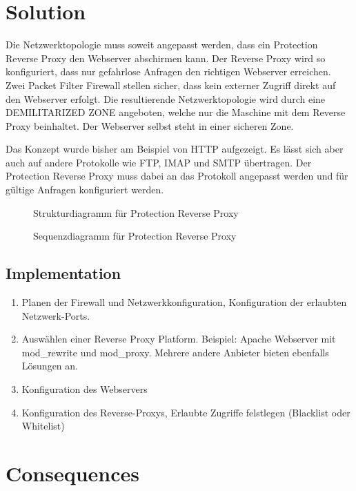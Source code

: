 \section{Solution}
Die Netzwerktopologie muss soweit angepasst werden, dass ein Protection Reverse Proxy den Webserver abschirmen kann. Der Reverse Proxy wird so konfiguriert, dass nur gefahrlose Anfragen den richtigen Webserver erreichen. Zwei Packet Filter Firewall stellen sicher, dass kein externer Zugriff direkt auf den Webserver erfolgt. Die resultierende Netzwerktopologie wird durch eine DEMILITARIZED ZONE angeboten, welche nur die Maschine mit dem Reverse Proxy beinhaltet. Der Webserver selbst steht in einer sicheren Zone.

Das Konzept wurde bisher am Beispiel von HTTP aufgezeigt. Es lässt sich aber auch auf andere Protokolle wie FTP, IMAP und SMTP übertragen. Der Protection Reverse Proxy muss dabei an das Protokoll angepasst werden und für gültige Anfragen konfiguriert werden.
\begin{figure}[H]
  \centering
  
  \caption{Strukturdiagramm f\"ur Protection Reverse Proxy}
\end{figure}
\begin{figure}[H]
  \centering
  
  \caption{Sequenzdiagramm f\"ur Protection Reverse Proxy}
\end{figure}
\clearpage
\subsection{Implementation}
\begin{enumerate}
\item Planen der Firewall und Netzwerkkonfiguration, Konfiguration der erlaubten Netzwerk-Ports.
\item Auswählen einer Reverse Proxy Platform. Beispiel: Apache Webserver mit mod\_rewrite und mod\_proxy. Mehrere andere Anbieter bieten ebenfalls Lösungen an.
\item Konfiguration des Webservers
\item Konfiguration des Reverse-Proxys, Erlaubte Zugriffe felstlegen (Blacklist oder Whitelist)
\end{enumerate}

\section{Consequences}
\begin{itemize}
\end{itemize}

